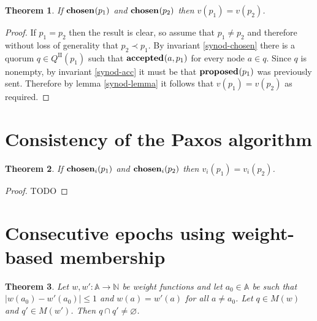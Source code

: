 \documentclass[journal]{IEEEtran}
\newtheorem{theorem}{Theorem}
\begin{document}
\begin{theorem}\label{synod-safety-theorem} If $\mathbf{chosen}_{}(p_1)$ and
$\mathbf{chosen}_{}(p_2)$ then $v(p_1) = v(p_2)$.  \end{theorem}

\begin{proof} If $p_1 = p_2$ then the result is clear, so assume that $p_1 \ne
p_2$ and therefore without loss of generality that $p_2 \prec p_1$. By
invariant \ref{synod-chosen} there is a quorum $q \in Q^\textrm{II}(p_1)$ such
that $\mathbf{accepted}_{}(a,p_1)$ for every node $a \in q$. Since $q$ is nonempty, by
invariant \ref{synod-acc} it must be that $\mathbf{proposed}_{}(p_1)$ was previously sent.
Therefore by lemma \ref{synod-lemma} it follows that $v(p_1) = v(p_2)$ as
required.  \end{proof}




\section{Consistency of the Paxos algorithm}

\begin{theorem}\label{paxos-safety-theorem} If $\mathbf{chosen}_{i}(p_1)$ and
$\mathbf{chosen}_{i}(p_2)$ then $v_i(p_1) = v_i(p_2)$.  \end{theorem}

\begin{proof}TODO\end{proof}

\section{Consecutive epochs using weight-based membership}

\begin{theorem} \label{weights-nearly-equal} Let $w, w' : \mathbb A \to \mathbb
N$ be weight functions and let $a_0 \in \mathbb A$ be such that $|w(a_0) -
w'(a_0)| \le 1$ and $w(a) = w'(a)$ for all $a \ne a_0$.  Let $q \in M(w)$ and
$q' \in M(w')$. Then $q \cap q' \ne \varnothing$.  \end{theorem}
\end{document}
